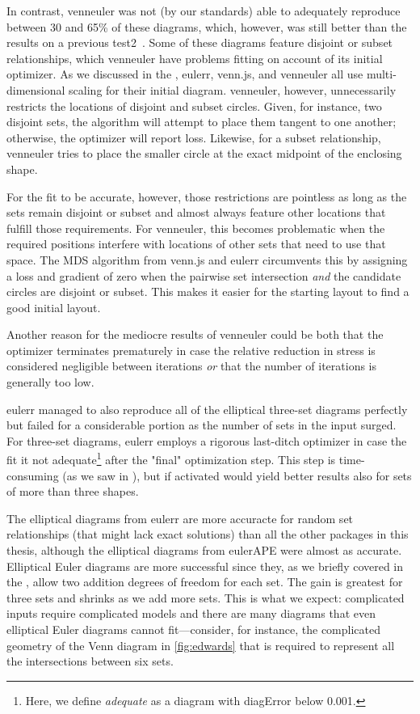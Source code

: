 \documentclass[
  oneside,
  openany,
  numbers=noendperiod,
  parskip=half,
  bibliography=totoc
]{scrbook}\usepackage[]{graphicx}\usepackage{xcolor}
\newcommand{\pkg}[1]{{\fontseries{b}\selectfont #1}}
\begin{document}
In contrast, \pkg{venneuler} was not (by our standards) able to adequately
reproduce between 30 and 65\%
of these  diagrams, which, however, was still better than the results on a previous
test2~\citep{Frederickson_2015b}. Some of these diagrams feature disjoint or subset
relationships, which \pkg{venneuler} have problems fitting on account of its
initial optimizer. As we discussed in the ,
\pkg{eulerr}, \pkg{venn.js}, and \pkg{venneuler} all use multi-dimensional scaling for
their initial diagram. \pkg{venneuler}, however, unnecessarily restricts the
locations of disjoint and subset circles. Given, for instance, two disjoint
sets, the algorithm will attempt to place them tangent to one another; otherwise,
the optimizer will report loss. Likewise, for a subset
relationship, \pkg{venneuler} tries to place the smaller circle at the exact
midpoint of the enclosing shape.

For the fit to be accurate, however, those restrictions are pointless as long as
the sets remain disjoint or subset and almost always feature
other locations that fulfill those requirements.
For \pkg{venneuler}, this becomes problematic when the required positions interfere
with locations of other sets that need to use that space. The
MDS algorithm from \pkg{venn.js} and \pkg{eulerr} circumvents this by
assigning a loss and gradient of zero when the pairwise set intersection
\emph{and} the candidate circles are disjoint or subset. This makes it easier
for the starting layout to find a good initial layout.

Another reason for the mediocre results of \pkg{venneuler} could be both that the optimizer
terminates prematurely in case the relative reduction in stress is considered negligible
between iterations \emph{or} that the number of iterations is generally too
low.

\pkg{eulerr} managed to also reproduce all of the elliptical
three-set diagrams perfectly but failed for a considerable portion as the number
of sets in the input surged.
For three-set diagrams, \pkg{eulerr} employs a rigorous last-ditch
optimizer in case the fit it not adequate\footnote{Here, we define \emph{adequate}
as a diagram with diagError below 0.001.} after the "final" optimization step. This step is
time-consuming (as we saw in ), but if activated
would yield better results also for sets of more than three shapes.

The elliptical diagrams from \pkg{eulerr} are more accuracte for random
set relationships (that might lack exact solutions) than all the
other packages in this thesis, although the elliptical diagrams from \pkg{eulerAPE}
were almost as accurate. Elliptical Euler diagrams are more successful since they,
as we briefly covered in the ,
allow two addition degrees of freedom for each set. The gain
is greatest for three sets and shrinks as we add more sets. This is what we
expect: complicated inputs require
complicated models and there are many diagrams that even elliptical Euler
diagrams cannot fit---consider, for instance, the complicated geometry of the
Venn diagram in \cref{fig:edwards} that is required to represent
all the intersections between six sets.
\end{document}
